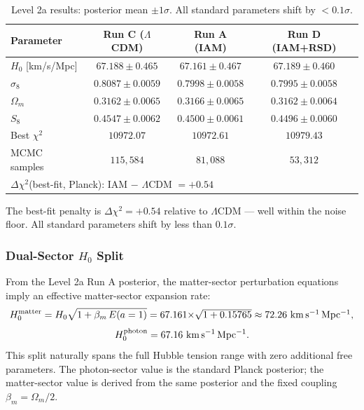 \documentclass[twocolumn,a4paper,aps,prd,twocolumn,showpacs,notitlepage,superscriptaddress,nofootinbib]{article}
\newcommand{\LCDM}{$\Lambda$CDM}
\newcommand{\betam}{\beta_{m}}
\newcommand{\Hmat}{H_{0}^{\rm matter}}
\newcommand{\Hphot}{H_{0}^{\rm photon}}
\newcommand{\Dchisq}{\Delta\chi^{2}}
\begin{document}
\begin{table}[t]
  \centering
  \caption{Level 2a results: posterior mean $\pm 1\sigma$.  All standard
    parameters shift by $< 0.1\sigma$.}
  \label{tab:level2a}
  \begin{tabular}{lccc}
    \toprule
    Parameter & Run C (\LCDM{}) & Run A (IAM) & Run D (IAM+RSD) \\
    \midrule
    $H_0$ [km/s/Mpc] & $67.188 \pm 0.465$ & $67.161 \pm 0.467$
      & $67.189 \pm 0.460$ \\
    $\sigma_8$ & $0.8087 \pm 0.0059$ & $0.7998 \pm 0.0058$
      & $0.7995 \pm 0.0058$ \\
    $\Omega_m$ & $0.3162 \pm 0.0065$ & $0.3166 \pm 0.0065$
      & $0.3162 \pm 0.0064$ \\
    $S_8$ & $0.4547 \pm 0.0062$ & $0.4500 \pm 0.0061$
      & $0.4496 \pm 0.0060$ \\
    Best $\chi^2$ & $10972.07$ & $10972.61$ & $10979.43$ \\
    MCMC samples & $115{,}584$ & $81{,}088$ & $53{,}312$ \\
    \midrule
    \multicolumn{4}{l}{$\Dchisq$(best-fit, Planck): IAM $-$ \LCDM{} $= +0.54$}
    \\
    \bottomrule
  \end{tabular}
\end{table}

The best-fit penalty is $\Dchisq = +0.54$ relative to \LCDM{} — well within
the noise floor.  All standard parameters shift by less than $0.1\sigma$.

\subsubsection{Dual-Sector $H_0$ Split}

From the Level 2a Run A posterior, the matter-sector perturbation equations
imply an effective matter-sector expansion rate:
 \begin{equation}
  \Hmat = H_0\sqrt{1 + \betam\,E(a=1)} = 67.161$$
 $$ \times \sqrt{1+0.15765}
  \approx 72.26~\rm km\,s^{-1}\,Mpc^{-1},
  \label{eq:h0split}
\end{equation}
\begin{equation}
  \Hphot = 67.16~\rm km\,s^{-1}\,Mpc^{-1}.
  \label{eq:h0photon}
\end{equation}
This split naturally spans the full Hubble tension range with zero additional
free parameters.  The photon-sector value is the standard Planck posterior;
the matter-sector value is derived from the same posterior and the fixed
coupling $\betam = \Omega_m/2$.
\end{document}
